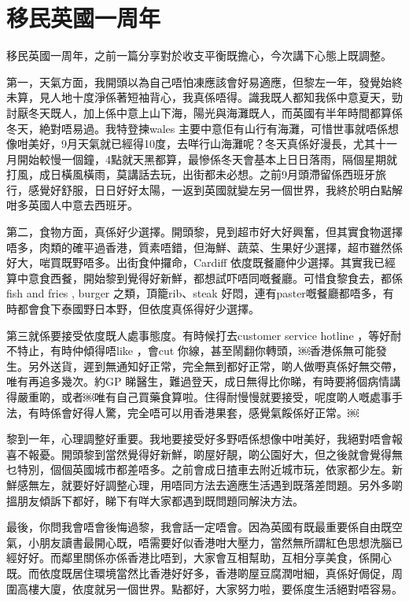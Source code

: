 \chapter{移民英國一周年}

移民英國一周年，之前一篇分享對於收支平衡既擔心，今次講下心態上既調整。

第一，天氣方面，我開頭以為自己唔怕凍應該會好易適應，但黎左一年，發覺始終未算，見人地十度淨係著短袖背心，我真係唔得。識我既人都知我係中意夏天，勁討厭冬天既人，加上係中意上山下海，陽光與海灘既人，而英國有半年時間都算係冬天，絶對唔易過。我特登揀wales 主要中意佢有山行有海灘，可惜世事就唔係想像咁美好，9月天氣就已經得10度，去咩行山海灘呢？冬天真係好漫長，尤其十一月開始較慢一個鐘，4點就天黑都算，最慘係冬天會基本上日日落雨，隔個星期就打風，成日橫風橫雨，莫講話去玩，出街都未必想。之前9月頭滯留係西班牙旅行，感覺好舒服，日日好好太陽，一返到英國就變左另一個世界，我終於明白點解咁多英國人中意去西班牙。

第二，食物方面，真係好少選擇。開頭黎，見到超市好大好興奮，但其實食物選擇唔多，肉類的確平過香港，質素唔錯，但海鮮、蔬菜、生果好少選擇，超市雖然係好大，啱買既野唔多。出街食仲攞命，Cardiff 依度既餐廳仲少選擇。其實我已經算中意食西餐，開始黎到覺得好新鮮，都想試吓唔同嘅餐廳。可惜食黎食去，都係fish and fries , burger 之類，頂籠rib、steak 好悶，連有paster嘅餐廳都唔多，有時都會食下泰國野日本野，但依度真係得好少選擇。

第三就係要接受依度既人處事態度。有時候打去customer service hotline ，等好耐不特止，有時仲傾得唔like ，會cut 你線，甚至鬧翻你轉頭，￼香港係無可能發生。另外送貨，遲到無通知好正常，完全無到都好正常，啲人做嘢真係好無交帶，唯有再追多幾次。約GP 睇醫生，難過登天，成日無得比你睇，有時要將個病情講得嚴重啲，或者￼唯有自己買藥食算啦。住得耐慢慢就要接受，呢度啲人嘅處事手法，有時係會好得人驚，完全唔可以用香港果套，感覺氣餒係好正常。￼

黎到一年，心理調整好重要。我地要接受好多野唔係想像中咁美好，我絕對唔會報喜不報憂。開頭黎到當然覺得好新鮮，啲屋好靚，啲公園好大，但之後就會覺得無乜特別，個個英國城市都差唔多。之前會成日揸車去附近城市玩，依家都少左。新鮮感無左，就要好好調整心理，用唔同方法去適應生活遇到既落差問題。另外多啲搵朋友傾訴下都好，睇下有咩大家都遇到既問題同解決方法。

最後，你問我會唔會後悔過黎，我會話一定唔會。因為英國有既最重要係自由既空氣，小朋友讀書最開心既，唔需要好似香港咁大壓力，當然無所謂紅色思想洗腦已經好好。而鄰里關係亦係香港比唔到，大家會互相幫助，互相分享美食，係開心既。而依度既居住環境當然比香港好好多，香港啲屋豆腐潤咁細，真係好侷促，周圍高樓大廈，依度就另一個世界。點都好，大家努力啦，要係度生活絕對唔容易。

